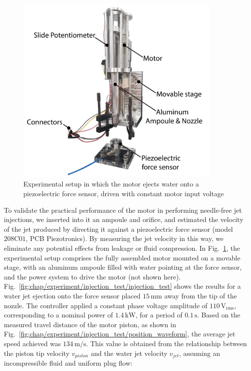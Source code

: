             \begin{figure}[h]
                \centering
                \includegraphics[width=4in]{chap5/images/injection_setup.pdf}
                \caption{Experimental setup in which the motor ejects water onto a piezoelectric force sensor, driven with constant motor input voltage}
                \label{fig:chap/experiment/validation/injection_test/injection_setup}
            \end{figure}


            To validate the practical performance of the motor in performing needle-free jet injections, we inserted into it an ampoule and orifice, and estimated the velocity of the jet produced by directing it against a piezoelectric force sensor (model $208\mathrm{C}01$, PCB Piezotronics). By measuring the jet velocity in this way, we eliminate any potential effects from leakage or fluid compression. In Fig.~\ref{fig:chap/experiment/validation/injection_test/injection_setup}, the experimental setup comprises the fully assembled motor mounted on a movable stage, with an aluminum ampoule filled with water pointing at the force sensor, and the power system to drive the motor (not shown here). Fig.~\ref{fig:chap/experiment/injection_test/injection_test} shows the results for a water jet ejection onto the force sensor placed $15\,\mathrm{mm}$ away from the tip of the nozzle. The controller applied a constant phase voltage amplitude of $110\,\mathrm{V_{rms}}$, corresponding to a nominal power of $1.4\,\mathrm{kW}$, for a period of $0.1\,\mathrm{s}$. Based on the measured travel distance of the motor piston, as shown in Fig.~\ref{fig:chap/experiment/injection_test/position_waveform}, the average jet speed achieved was $134\,\mathrm{m/s}$. This value is obtained from the relationship between the piston tip velocity $v_{piston}$ and the water jet velocity $v_{jet}$, assuming an incompressible fluid and uniform plug flow:
            

